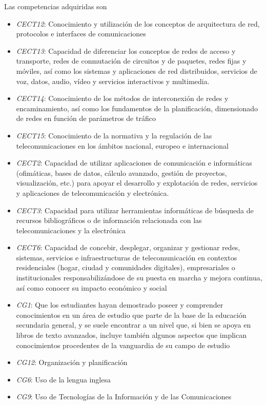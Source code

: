 \documentclass[xcolor=table,xcolor=x11names]{beamer}
\begin{document}
\begin{frame}[allowframebreaks]{\subsecname}
    Las competencias adquiridas son
    \begin{itemize}
        \item \emph{CECT12}: Conocimiento y utilización de los conceptos de arquitectura de red, protocolos e interfaces de
comunicaciones
\item \emph{CECT13}: Capacidad de diferenciar los conceptos de redes de acceso y transporte, redes de conmutación de
circuitos y de paquetes, redes fijas y móviles, así como los sistemas y aplicaciones de red distribuidos, servicios de
voz, datos, audio, vídeo y servicios interactivos y multimedia.
\item \emph{CECT14}: Conocimiento de los métodos de interconexión de redes y encaminamiento, así como los fundamentos
de la planificación, dimensionado de redes en función de parámetros de tráfico
\item \emph{CECT15}: Conocimiento de la normativa y la regulación de las telecomunicaciones en los ámbitos nacional,
europeo e internacional
\item \emph{CECT2}: Capacidad de utilizar aplicaciones de comunicación e informáticas (ofimáticas, bases de datos, cálculo
avanzado, gestión de proyectos, visualización, etc.) para apoyar el desarrollo y explotación de redes, servicios y
aplicaciones de telecomunicación y electrónica.
\item \emph{CECT3}: Capacidad para utilizar herramientas informáticas de búsqueda de recursos bibliográficos o de
información relacionada con las telecomunicaciones y la electrónica
\item \emph{CECT6}: Capacidad de concebir, desplegar, organizar y gestionar redes, sistemas, servicios e infraestructuras de
telecomunicación en contextos residenciales (hogar, ciudad y comunidades digitales), empresariales o
institucionales responsabilizándose de su puesta en marcha y mejora continua, así como conocer su impacto
económico y social
\item \emph{CG1}: Que los estudiantes hayan demostrado poseer y comprender conocimientos en un área de estudio que
parte de la base de la educación secundaria general, y se suele encontrar a un nivel que, si bien se apoya en
libros de texto avanzados, incluye también algunos aspectos que implican conocimientos procedentes de la
vanguardia de su campo de estudio
\item \emph{CG12}: Organización y planificación
\item \emph{CG6}: Uso de la lengua inglesa
\item \emph{CG9}: Uso de Tecnologías de la Información y de las Comunicaciones
    \end{itemize}
\end{frame}
\end{document}
